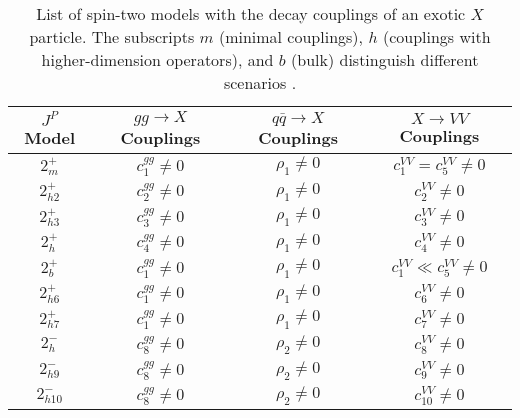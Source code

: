 \begin{table}
\caption[List of spin-two models with the decay couplings of an exotic $X$ particle. The subscripts $m$ (minimal couplings), $h$ (couplings with higher-dimension operators), and $b$ (bulk) distinguish different scenarios.]{ List of spin-two models with the decay couplings of an exotic $X$ particle. The subscripts $m$ (minimal couplings), $h$ (couplings with higher-dimension operators), and $b$ (bulk) distinguish different scenarios \cite{Khachatryan:2014kca}. }
\centering
\begin{tabular}{cccc}
$J^{P}$ Model  &  $gg \to X$ Couplings   & $q\bar{q} \to X$ Couplings & $X \to VV$ Couplings \\

\hline

$2_m^+$  &   $c_{ 1}^{gg}\ne0$  &  $\rho_1\ne0$  & $c_{ 1}^{VV}=c_{ 5}^{VV}\ne0$     \\

$2_{h2}^+$      &   $c_{ 2}^{gg}\ne0$  &  $\rho_1\ne0$     & $c_{ 2}^{VV}\ne0$  \\

$2_{h3}^+$     &   $c_{ 3}^{gg}\ne0$  &  $\rho_1\ne0$ & $c_{ 3}^{VV}\ne0$  \\

$2_h^+$  &   $c_{ 4}^{gg}\ne0$ &  $\rho_1\ne0$ & $c_{ 4}^{VV}\ne0$  \\

$2_b^+$   &   $c_{ 1}^{gg}\ne0$  &  $\rho_1\ne0$ &  $c_{ 1}^{VV} \ll c_{ 5}^{VV}\ne0$ \\

$2_{h6}^+$  &   $c_{ 1}^{gg}\ne0$ &  $\rho_1\ne0$ & $c_{ 6}^{VV}\ne0$  \\

$2_{h7}^+$ &   $c_{ 1}^{gg}\ne0$ &  $\rho_1\ne0$ & $c_{ 7}^{VV}\ne0$ \\

$2_h^-$  &    $c_{ 8}^{gg}\ne0$ &  $\rho_2\ne0$ & $c_{ 8}^{VV}\ne0$  \\

$2_{h9}^-$ &    $c_{ 8}^{gg}\ne0$ &  $\rho_2\ne0$ & $c_{ 9}^{VV}\ne0$ \\

$2_{h10}^-$ &    $c_{ 8}^{gg}\ne0$ &  $\rho_2\ne0$ & $c_{ 10}^{VV}\ne0$ \\
\end{tabular}

\label{tab:scenarios}
\end{table}
